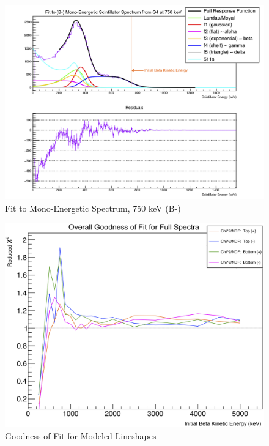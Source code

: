 \begin{figure}[h!!tb]
	\centering
	\includegraphics[width=.999\linewidth]
	{Figures/MonoFit_750.png}
	\caption[Fit to Mono-Energetic Spectrum, 750 keV]{Fit to Mono-Energetic Spectrum, 750 keV (B-)}	
\end{figure}


\begin{figure}[h!!tb]
	\centering
	\includegraphics[width=.999\linewidth]
	{Figures/Lineshape_Chi2.png}
	\caption[Goodness of Fit for Modeled Lineshapes]{Goodness of Fit for Modeled Lineshapes}	
\end{figure}

